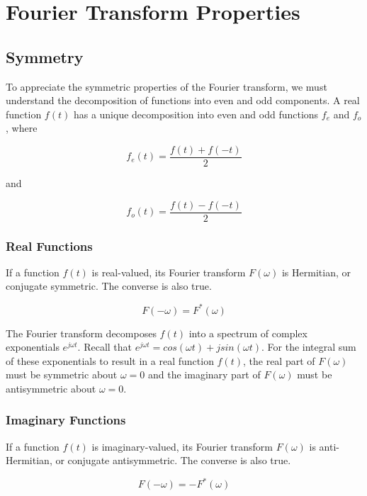 \chapter{Fourier Transform Properties}

\section{Symmetry}

To appreciate the symmetric properties of the Fourier transform, we must understand the decomposition of functions into even and odd components. A real function $f(t)$ has a unique decomposition into even and odd functions $f_e$ and $f_o$, where

\begin{equation}
	f_e(t) = \frac{f(t) + f(-t)}{2}
\end{equation}

and

\begin{equation}
	f_o(t) = \frac{f(t) - f(-t)}{2}
\end{equation}

\subsection{Real Functions}

If a function $f(t)$ is real-valued, its Fourier transform $F(\omega)$ is Hermitian, or conjugate symmetric. The converse is also true.

\begin{equation}
	F(-\omega) = F^*(\omega)
\end{equation}

The Fourier transform decomposes $f(t)$ into a spectrum of complex exponentials $e^{j\omega t}$. Recall that $e^{j\omega t} = cos(\omega t) + jsin(\omega t)$. For the integral sum of these exponentials to result in a real function $f(t)$, the real part of $F(\omega)$ must be symmetric about $\omega = 0$ and the imaginary part of $F(\omega)$ must be antisymmetric about $\omega = 0$.

\subsection{Imaginary Functions}

If a function $f(t)$ is imaginary-valued, its Fourier transform $F(\omega)$ is anti-Hermitian, or conjugate antisymmetric. The converse is also true.

\begin{equation}
	F(-\omega) = -F^*(\omega)
\end{equation}



